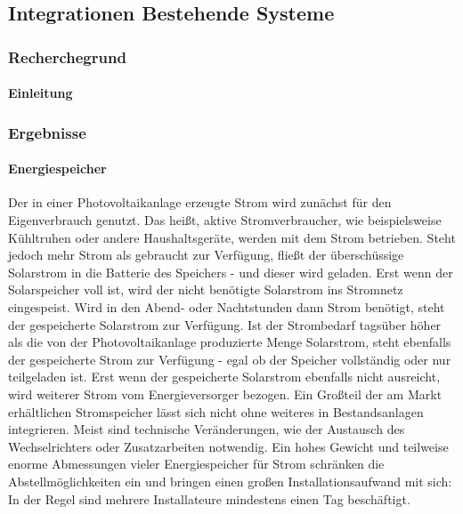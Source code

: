 \subsection{Integrationen Bestehende Systeme}

\subsubsection{Recherchegrund}
\paragraph{Einleitung}


\subsubsection{Ergebnisse}
\paragraph{Energiespeicher}
Der in einer Photovoltaikanlage erzeugte Strom wird zunächst für den Eigenverbrauch genutzt. Das heißt, aktive Stromverbraucher, wie beispielsweise Kühltruhen oder andere Haushaltsgeräte, werden mit dem Strom betrieben. Steht jedoch mehr Strom als gebraucht zur Verfügung, fließt der überschüssige Solarstrom in die Batterie des Speichers - und dieser wird geladen. Erst wenn der Solarspeicher voll ist, wird der nicht benötigte Solarstrom ins Stromnetz eingespeist.
Wird in den Abend- oder Nachtstunden dann Strom benötigt, steht der gespeicherte Solarstrom zur Verfügung. Ist der Strombedarf tagsüber höher als die von der Photovoltaikanlage produzierte Menge Solarstrom, steht ebenfalls der gespeicherte Strom zur Verfügung - egal ob der Speicher vollständig oder nur teilgeladen ist. Erst wenn der gespeicherte Solarstrom ebenfalls nicht ausreicht, wird weiterer Strom vom Energieversorger bezogen.
Ein Großteil der am Markt erhältlichen Stromspeicher lässt sich nicht ohne weiteres in Bestandsanlagen integrieren. Meist sind technische Veränderungen, wie der Austausch des Wechselrichters oder Zusatzarbeiten notwendig. Ein hohes Gewicht und teilweise enorme Abmessungen vieler Energiespeicher für Strom schränken die Abstellmöglichkeiten ein und bringen einen großen Installationsaufwand mit sich: In der Regel sind mehrere Installateure mindestens einen Tag beschäftigt.


